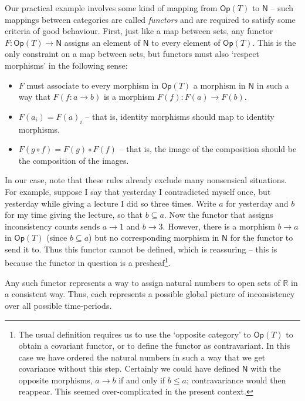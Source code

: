 \documentclass[oneside,english]{article}
\theoremstyle{plain}
\theoremstyle{definition}
\theoremstyle{definition}
\begin{document}
Our practical example involves some kind of mapping from $\boldsymbol{\mathsf{Op}}(T)$ to $\boldsymbol{\mathsf{N}}$ -- such mappings between categories are called \emph{functors} and are required to satisfy some criteria of good behaviour. First, just like a map between sets, any functor $F:\boldsymbol{\mathsf{Op}}(T)\to \boldsymbol{\mathsf{N}}$ assigns an element of $\boldsymbol{\mathsf{N}}$ to every element of $\boldsymbol{\mathsf{Op}}(T)$. This is the only constraint on a map between sets, but functors must also `respect morphisms' in the following sense:
\begin{itemize}
	\item  $F$ must associate to every morphism in $\boldsymbol{\mathsf{Op}}(T)$ a morphism in $\boldsymbol{\mathsf{N}}$ in such a way that $F(f:a\to b)$ is a morphism $F(f):F(a)\to F(b)$.
	\item $F(a_i) = F(a)_i$ -- that is, identity morphisms should map to identity morphisms.
	\item $F(g\circ f) = F(g)\circ F(f)$ -- that is, the image of the composition should be the composition of the images.
\end{itemize}
In our case, note that these rules already exclude many nonsensical situations. For example, suppose I say that yesterday I contradicted myself once, but yesterday while giving a lecture I did so three times. Write $a$ for yesterday and $b$ for my time giving the lecture, so that $b\subseteq a$. Now the functor that assigns inconsistency counts sends $a\to 1$ and $b\to 3$. However, there is a morphism $b\to a$ in $\boldsymbol{\mathsf{Op}}(T)$ (since $b\subseteq a$) but no corresponding morphism in $\boldsymbol{\mathsf{N}}$ for the functor to send it to. Thus this functor cannot be defined, which is reassuring -- this is because the functor in question is a presheaf\footnote{The usual definition requires us to use the `opposite category' to $\boldsymbol{\mathsf{Op}}(T)$ to obtain a covariant functor, or to define the functor as contravariant. In this case we have ordered the natural numbers in such a way that we get covariance without this step. Certainly we could have defined $\boldsymbol{\mathsf{N}}$ with the opposite morphisms, $a\to b$ if and only if $b\le a$; contravariance would then reappear. This seemed over-complicated in the present context.}.

Any such functor represents a way to assign natural numbers to open sets of $\mathbb{R}$ in a consistent way. Thus, each represents a possible global picture of inconsistency over all possible time-periods.
\end{document}
